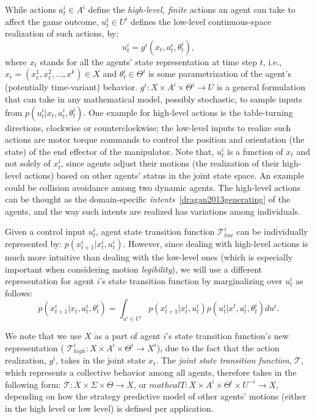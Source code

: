 \documentclass[letterpaper, 10 pt, conference]{ieeeconf}  %
\begin{document}
While actions $a_t^i \in A^i$ define the \textit{high-level, finite} actions an 
agent can take to affect the game outcome, $u_t^i \in U^i$ defines the low-level continuous-space
realization of such actions, by:
\begin{equation}\label{eq:g_function}
  u_t^i = g^i(x_t, a^i_t, \theta^i_t),
\end{equation}
where $x_t$ stands for all the agents' state representation at time step $t$, i.e., $x_t = (x^1_t, x^2_t,...,x^k)\in X$ and $\theta^i_t \in \Theta^i$ is some parametrization of the agent's (potentially time-variant) behavior.
$g^i:X \times A^i \times \Theta^i \rightarrow U$ is a general formulation that 
can take in any mathematical model, possibly stochastic, to sample inputs from $p(u_t^i|x_t,a^i_t,\theta_t^i)$. 
One example for high-level actions is the table-turning directions, clockwise 
or counterclockwise; the 
low-level inputs to realize such actions are motor torque commands to 
control the position and orientation (the state) of the end effector of the 
manipulator. Note that, $u_t^i$ is a 
function of $x_t$ and not solely of $x^i_t$, since agents adjust their 
motions (the realization of their high-level actions) based on other agents' 
status in the joint state space. 
An example could be collision 
avoidance among two dynamic agents.
The high-level actions can be thought as the 
domain-specific \textit{intents}~\ref{dragan2013generating} of the agents, and 
the way such intents are realized has variations among individuals.  

Given a control input $u_t^i$, agent state transition function $\mathcal{T}^i_{low}$ 
can be individually represented by: $p(x^i_{t+1}|x^i_t,u^i_t)$. However, since 
dealing with high-level actions is much more intuitive than dealing with the 
low-level ones (which is especially important when considering motion \textit{legibility}), we will use a different representation for agent $i$'s 
state transition function by marginalizing over $u^i_t$ as follows:
\begin{equation}
  p(x^i_{t+1}|x_t,a^i_t,\theta^i_t) = \int_{u^i \in U^i} 
  p(x_{t+1}^i|x^i_t,u^i_t) p(u^i_t|x^t,a^i_t,\theta^i_t)du^i.
\end{equation}

We note that we use $X$ as a part of agent $i$'s state transition function's 
new representation (
$\mathcal{T}^i_{high}:X \times A^i \times \Theta^i \rightarrow X^i$), due to 
the fact that the action realization, $g^i$, takes in the joint state $x_t$. 
The \textit{joint state transition function}, $\mathcal{T}$, which 
represents a collective behavior among all agents, therefore takes in the 
following form: 
$\mathcal{T}:X \times \Sigma \times \Theta \rightarrow X$, or 
$mathcal{T}:X \times A^i \times \Theta^i \times U^{-i} \rightarrow X$, 
depending on how the strategy predictive model of other agents' motions 
(either in the high level or low level) is defined per application. 
\end{document}
